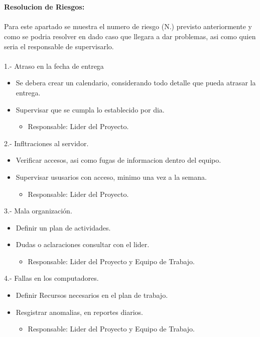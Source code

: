 \documentclass[40pt]{article}
\begin{document}
\maketitle
\textsf{\ \\
\\
\textbf{Resolucion de Riesgos:}\\
\\
Para este apartado se muestra el numero de riesgo (N.) previsto anteriormente y como se podria resolver en dado caso que llegara a dar problemas, asi como quien seria el responsable de supervisarlo. \\}
\\
1.- Atraso en la fecha de entrega
\begin{itemize}
    \item Se debera crear un calendario, considerando todo detalle que pueda atrasar la entrega.
    \item Supervisar que se cumpla lo establecido por dia.
    \begin{itemize}
      \item Responsable: Lider del Proyecto.
    \end{itemize}  
\end{itemize}
2.- Infltraciones al servidor.
\begin{itemize}
    \item Verificar accesos, asi como fugas de informacion dentro del equipo.
    \item Supervisar ususarios con acceso, minimo una vez a la semana.
    \begin{itemize}
      \item Responsable: Lider del Proyecto.
    \end{itemize}  
\end{itemize}
3.- Mala organización.
\begin{itemize}
    \item Definir un plan de actividades.
    \item Dudas o aclaraciones consultar con el lider.
    \begin{itemize}
      \item Responsable: Lider del Proyecto y Equipo de Trabajo.
    \end{itemize}  
\end{itemize}
4.- Fallas en los computadores.
\begin{itemize}
    \item Definir Recursos necesarios en el plan de trabajo.
    \item Resgistrar anomalias, en reportes diarios.
    \begin{itemize}
      \item Responsable: Lider del Proyecto y Equipo de Trabajo.
    \end{itemize}  
\end{itemize}
\end{document}
